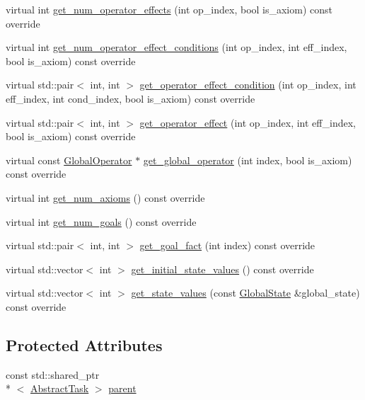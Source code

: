 \begin{DoxyCompactItemize}
virtual int \hyperlink{classDelegatingTask_af3f485cdbd1872e11ca53a47da104d35}{get\-\_\-num\-\_\-operator\-\_\-effects} (int op\-\_\-index, bool is\-\_\-axiom) const override
\item 
virtual int \hyperlink{classDelegatingTask_a63119dfe36f38c8eaefa093a8d944b70}{get\-\_\-num\-\_\-operator\-\_\-effect\-\_\-conditions} (int op\-\_\-index, int eff\-\_\-index, bool is\-\_\-axiom) const override
\item 
virtual std\-::pair$<$ int, int $>$ \hyperlink{classDelegatingTask_aaabb1108e7759110b1125482ba528e74}{get\-\_\-operator\-\_\-effect\-\_\-condition} (int op\-\_\-index, int eff\-\_\-index, int cond\-\_\-index, bool is\-\_\-axiom) const override
\item 
virtual std\-::pair$<$ int, int $>$ \hyperlink{classDelegatingTask_a3f2571a63c2b22327df586e5a9d0df3e}{get\-\_\-operator\-\_\-effect} (int op\-\_\-index, int eff\-\_\-index, bool is\-\_\-axiom) const override
\item 
virtual const \hyperlink{classGlobalOperator}{Global\-Operator} $\ast$ \hyperlink{classDelegatingTask_a3807759260be9458378190ff25751b70}{get\-\_\-global\-\_\-operator} (int index, bool is\-\_\-axiom) const override
\item 
virtual int \hyperlink{classDelegatingTask_af215094028d4c83cce4321e2cb2d011b}{get\-\_\-num\-\_\-axioms} () const override
\item 
virtual int \hyperlink{classDelegatingTask_a25fcb2255c42d684f89524de475f166e}{get\-\_\-num\-\_\-goals} () const override
\item 
virtual std\-::pair$<$ int, int $>$ \hyperlink{classDelegatingTask_a41ec9662ab3cd04af01e64a3805436fc}{get\-\_\-goal\-\_\-fact} (int index) const override
\item 
virtual std\-::vector$<$ int $>$ \hyperlink{classDelegatingTask_a62c81bb064e4d5e72f619f01e1e3f73c}{get\-\_\-initial\-\_\-state\-\_\-values} () const override
\item 
virtual std\-::vector$<$ int $>$ \hyperlink{classDelegatingTask_a04ac3437f7f4ae171190ef5972d8d16e}{get\-\_\-state\-\_\-values} (const \hyperlink{classGlobalState}{Global\-State} \&global\-\_\-state) const override
\end{DoxyCompactItemize}
\subsection*{Protected Attributes}
\begin{DoxyCompactItemize}
\item 
const std\-::shared\-\_\-ptr\\*
$<$ \hyperlink{classAbstractTask}{Abstract\-Task} $>$ \hyperlink{classDelegatingTask_a333f326a36598317987befd345c7836e}{parent}
\end{DoxyCompactItemize}


